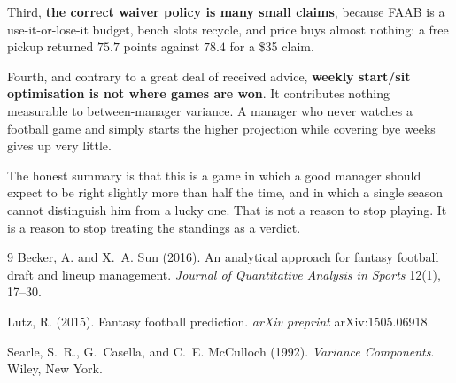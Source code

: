 \documentclass[11pt]{article}
\begin{document}
Third, \textbf{the correct waiver policy is many small claims}, because FAAB is
a use-it-or-lose-it budget, bench slots recycle, and price buys almost nothing:
a free pickup returned $75.7$ points against $78.4$ for a \$35 claim.

Fourth, and contrary to a great deal of received advice, \textbf{weekly start/sit
optimisation is not where games are won}. It contributes nothing measurable to
between-manager variance. A manager who never watches a football game and simply
starts the higher projection while covering bye weeks gives up very little.

The honest summary is that this is a game in which a good manager should expect
to be right slightly more than half the time, and in which a single season
cannot distinguish him from a lucky one. That is not a reason to stop playing.
It is a reason to stop treating the standings as a verdict.

\begin{thebibliography}{9}
Becker, A. and X.~A. Sun (2016).
\newblock An analytical approach for fantasy football draft and lineup management.
\newblock \emph{Journal of Quantitative Analysis in Sports} 12(1), 17--30.

Lutz, R. (2015).
\newblock Fantasy football prediction.
\newblock \emph{arXiv preprint} arXiv:1505.06918.

Searle, S.~R., G.~Casella, and C.~E. McCulloch (1992).
\newblock \emph{Variance Components}.
\newblock Wiley, New York.
\end{thebibliography}
\end{document}
